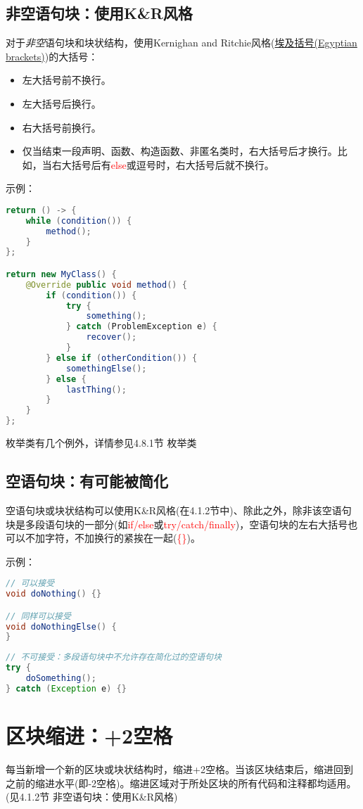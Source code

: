 \documentclass[cn,11pt,chinese]{elegantbook}
\begin{document}
\subsection{非空语句块：使用K\&R风格}
对于\emph{非空}语句块和块状结构，使用Kernighan and Ritchie风格(\href{https://blog.codinghorror.com/new-programming-jargon/}{埃及括号(Egyptian brackets)})的大括号：
\begin{itemize}
	\item 左大括号前不换行。
	\item 左大括号后换行。
	\item 右大括号前换行。
	\item 仅当结束一段声明、函数、构造函数、非匿名类时，右大括号后才换行。比如，当右大括号后有\textcolor{red}{else}或逗号时，右大括号后就不换行。
\end{itemize}

示例：
\begin{lstlisting}[language=java]
return () -> {
	while (condition()) {
		method();
	}
};

return new MyClass() {
	@Override public void method() {
		if (condition()) {
			try {
				something();
			} catch (ProblemException e) {
				recover();
			}
		} else if (otherCondition()) {
			somethingElse();
		} else {
			lastThing();
		}
	}
};
\end{lstlisting}

枚举类有几个例外，详情参见4.8.1节 枚举类

\subsection{空语句块：有可能被简化}
空语句块或块状结构可以使用K\&R风格(在4.1.2节中)、除此之外，除非该空语句块是多段语句块的一部分(如\textcolor{red}{if/else}或\textcolor{red}{try/catch/finally})，空语句块的左右大括号也可以不加字符，不加换行的紧挨在一起(\textcolor{red}{\{\}})。

示例：
\begin{lstlisting}[language=java]
// 可以接受
void doNothing() {}

// 同样可以接受
void doNothingElse() {
}
\end{lstlisting}

\begin{lstlisting}[language=java]
// 不可接受：多段语句块中不允许存在简化过的空语句块
try {
	doSomething();
} catch (Exception e) {}
\end{lstlisting}

\section{区块缩进：+2空格}
每当新增一个新的区块或块状结构时，缩进+2空格。当该区块结束后，缩进回到之前的缩进水平(即-2空格)。缩进区域对于所处区块的所有代码和注释都均适用。(见4.1.2节 非空语句块：使用K\&R风格)
\end{document}
